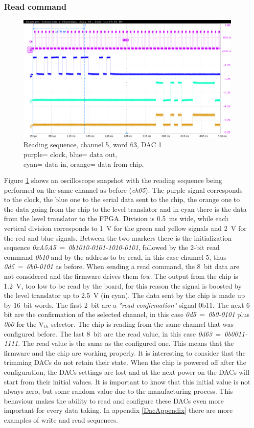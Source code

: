 \subsubsection{Read command}
\begin{figure}[H]
	\centering
	\includegraphics[width=0.7\linewidth]{IMG/ch5/probe/09-08-2021_ch05-read63-baselinedac1}
	\caption{Reading sequence, channel 5, word 63, DAC 1\\{\color{magenta}purple}= clock, {\color{blue}blue}= data out,\\{\color{cyan}cyan}= data in, {\color{orange}orange}= data from chip.}
	\label{fig:ch05read63}
\end{figure}
\noindent Figure \ref{fig:ch05read63} shows an oscilloscope snapshot with the reading sequence being performed on the same channel as before (\textit{ch05}).
The purple signal corresponds to the clock, the blue one to the serial data sent to the chip, the orange one to the data going from the chip to the level translator and in cyan there is the data from the level translator to the FPGA.
Division is 0.5~ms wide, while each vertical division corresponds to 1~V for the green and yellow signals and 2~V for the red and blue signals.
Between the two markers there is the initialization sequence \textit{0xA5A5}~=~\textit{0b1010-0101-1010-0101}, followed by the 2-bit read command \textit{0b10} and by the address to be read, in this case channel 5, thus \textit{0d5}~=~\textit{0b0-0101} as before.
When sending a read command, the 8~bit data are not considered and the firmware drives them \textit{low}.
The output from the chip is 1.2~V, too low to be read by the board, for this reason the signal is boosted by the level translator up to 2.5~V (in cyan).
The data sent by the chip is made up by 16~bit words. The first 2~bit are a \textit{"read confirmation"} signal 0b11. The next 6 bit are the confirmation of the selected channel, in this case \textit{0d5}~=~\textit{0b0-0101} plus \textit{0b0} for the V$_{th}$ selector.
The chip is reading from the same channel that was configured before.
The last 8~bit are the read value, in this case \textit{0d63}~=~\textit{0b0011-1111}.
The read value is the same as the configured one. This means that the firmware and the chip are working properly.
It is interesting to consider that the trimming DACs do not retain their state.
When the chip is powered off after the configuration, the DACs settings are lost and at the next power on the DACs will start from their initial values.
It is important to know that this initial value is not always zero, but some random value due to the manufacturing process.
This behaviour makes the ability to read and configure these DACs even more important for every data taking. In appendix \ref{DacAppendix} there are more examples of write and read sequences. 
